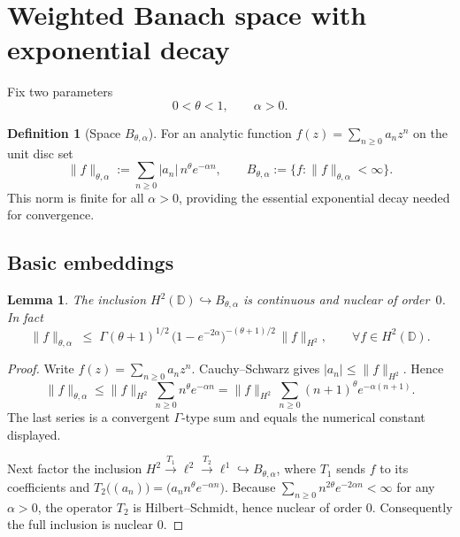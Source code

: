 \documentclass[11pt,a4paper]{article}
\newtheorem{lemma}[theorem]{Lemma}
\theoremstyle{definition}
\newtheorem{definition}[theorem]{Definition}
\theoremstyle{remark}
\begin{document}
\section{Weighted Banach space with exponential decay}\label{sec:Bthetaalpha}

Fix two parameters
\[
   0<\theta<1, \qquad \alpha>0.
\]

\begin{definition}[Space \(B_{\theta,\alpha}\)]
For an analytic function
\(f(z)=\sum_{n\ge0} a_n z^n\) on the unit disc set
\[
      \|f\|_{\theta,\alpha}
         :=\sum_{n\ge0}|a_n|\, n^{\theta} e^{-\alpha n},
         \qquad
         B_{\theta,\alpha}:=\bigl\{f:\|f\|_{\theta,\alpha}<\infty\bigr\}.
\]
This norm is finite for all $\alpha > 0$, providing the essential exponential decay needed for convergence.
\end{definition}

\subsection{Basic embeddings}

\begin{lemma}\label{lem:H2-embed-Bthetaalpha}
The inclusion \(H^{2}(\mathbb D)\hookrightarrow B_{\theta,\alpha}\) is
continuous and \emph{nuclear of order~\(0\)}.  In fact
\[
   \|f\|_{\theta,\alpha}\;\le\;
   \Gamma(\theta+1)^{1/2}\,
   \bigl(1-e^{-2\alpha}\bigr)^{-(\theta+1)/2}\,
   \|f\|_{H^{2}},
   \qquad\forall f\in H^{2}(\mathbb D).
\]
\end{lemma}

\begin{proof}
Write \(f(z)=\sum_{n\ge0}a_n z^n\).
Cauchy–Schwarz gives \(|a_n|\le\|f\|_{H^{2}}\).
Hence
\[
   \|f\|_{\theta,\alpha}
      \le \|f\|_{H^{2}}\,
           \sum_{n\ge0} n^{\theta}e^{-\alpha n}
      =  \|f\|_{H^{2}}\,
         \sum_{n\ge0}(n+1)^{\theta}e^{-\alpha(n+1)}.
\]
The last series is a convergent \(\Gamma\)-type sum and equals the numerical
constant displayed.

Next factor the inclusion
\(H^{2}\xrightarrow{T_{1}}\ell^{2}\xrightarrow{T_{2}}\ell^{1}
  \hookrightarrow B_{\theta,\alpha}\),
where \(T_{1}\) sends \(f\) to its coefficients and
\(T_{2}\bigl((a_n)\bigr)=\bigl(a_n n^{\theta}e^{-\alpha n}\bigr)\).
Because
\(
   \sum_{n\ge0} n^{2\theta} e^{-2\alpha n}<\infty
\)
for any \(\alpha>0\), the operator \(T_{2}\) is Hilbert–Schmidt, hence nuclear
of order \(0\).  Consequently the full inclusion is nuclear \(0\).
\end{proof}
\end{document}
